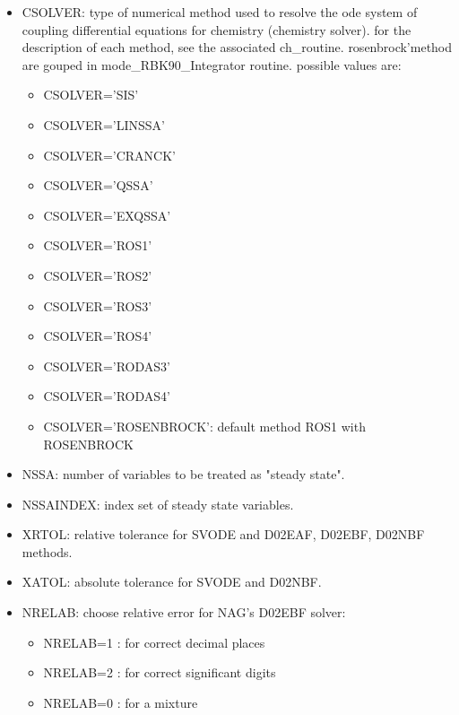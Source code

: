 \begin{itemize}

\item CSOLVER: type of numerical method used to resolve the ode system of coupling differential equations for chemistry (chemistry solver). for the description of each method, see the associated  ch\_routine. rosenbrock'method are gouped in mode\_RBK90\_Integrator routine. possible values are: 
\begin{itemize}
         \item CSOLVER='SIS'
         \item CSOLVER='LINSSA'
         \item CSOLVER='CRANCK'
         \item CSOLVER='QSSA'
         \item CSOLVER='EXQSSA'
         \item CSOLVER='ROS1'
         \item CSOLVER='ROS2'
         \item CSOLVER='ROS3'
         \item CSOLVER='ROS4'
         \item CSOLVER='RODAS3'
         \item CSOLVER='RODAS4'
         \item CSOLVER='ROSENBROCK': default method ROS1 with ROSENBROCK
\end{itemize}

\item NSSA: number of variables to be treated as "steady state".

\item NSSAINDEX: index set of steady state variables.

\item XRTOL: relative tolerance for SVODE and D02EAF, D02EBF, D02NBF methods.

\item XATOL: absolute tolerance for SVODE and D02NBF.

\item NRELAB: choose relative error for NAG's D02EBF solver:
\begin{itemize}
          \item NRELAB=1 : for correct decimal places
          \item NRELAB=2 : for correct significant digits
          \item NRELAB=0 : for a mixture
\end{itemize}


\end{itemize}
